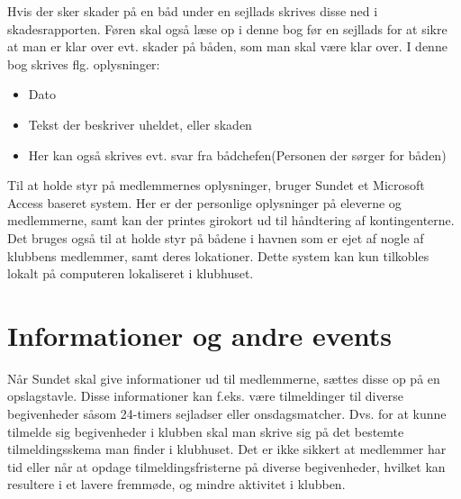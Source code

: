 Hvis der sker skader på en båd under en sejllads skrives disse ned i skadesrapporten. Føren skal også læse op i denne bog før en sejllads for at sikre at man er klar over evt. skader på båden, som man skal være klar over. I denne bog skrives flg. oplysninger:

\begin{itemize}
	\item Dato
	\item Tekst der beskriver uheldet, eller skaden
	\item Her kan også skrives evt. svar fra bådchefen(Personen der sørger for båden)
\end{itemize}

Til at holde styr på medlemmernes oplysninger, bruger Sundet et Microsoft Access baseret system. Her er der personlige oplysninger på eleverne og medlemmerne, samt kan der printes girokort ud til håndtering af kontingenterne. Det bruges også til at holde styr på bådene i havnen som er ejet af nogle af klubbens medlemmer, samt deres lokationer. Dette system kan kun tilkobles lokalt på computeren lokaliseret i klubhuset.

\section{Informationer og andre events}

Når Sundet skal give informationer ud til medlemmerne, sættes disse op på en opslagstavle. Disse informationer kan f.eks. være tilmeldinger til diverse begivenheder såsom 24-timers sejladser eller onsdagsmatcher. Dvs. for at kunne tilmelde sig begivenheder i klubben skal man skrive sig på det bestemte tilmeldingsskema man finder i klubhuset. Det er ikke sikkert at medlemmer har tid eller når at opdage tilmeldingsfristerne på diverse begivenheder, hvilket kan resultere i et lavere fremmøde, og mindre aktivitet i klubben.
